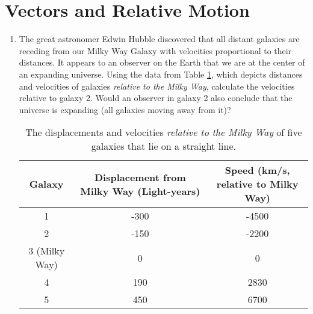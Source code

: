 \documentclass[10pt]{article}
\begin{document}
\section{Vectors and Relative Motion}
\begin{enumerate}
\item The great astronomer Edwin Hubble discovered that all distant galaxies are receding from our Milky Way Galaxy with velocities proportional to their distances. It appears to an observer on the Earth that we are at the center of an expanding universe.  Using the data from Table \ref{tab1}, which depicts distances and velocities of galaxies \textit{relative to the Milky Way}, calculate the velocities relative to galaxy 2.  Would an observer in galaxy 2 also conclude that the universe is expanding (all galaxies moving away from it)?
\begin{table}
\begin{tabular}{| c | c | c |}
\hline
Galaxy & Displacement from Milky Way (Light-years) & Speed (km/s, relative to Milky Way) \\ \hline
1 & -300 & -4500 \\ \hline
2 & -150 & -2200 \\ \hline
3 (Milky Way) & 0 & 0 \\ \hline
4 & 190 & 2830 \\ \hline
5 & 450 & 6700 \\ \hline
\end{tabular}
\caption{\label{tab1} The displacements and velocities \textit{relative to the Milky Way} of five galaxies that lie on a straight line.}
\end{table}
\end{enumerate}
\end{document}
